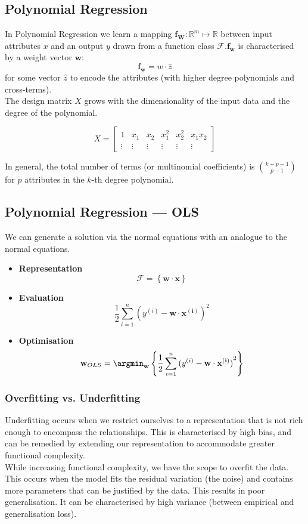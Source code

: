 \subsection{Polynomial Regression}
In Polynomial Regression we learn a mapping $\mathbf{f_W}:\mathbb{R}^{m}\mapsto
\mathbb{R}$ between input attributes $x$ and an output $y$ drawn from a function
class $\mathcal{F}$.$\mathbf{f_w}$ is characterised by a weight vector $\mathbf{w}$:
\[\mathbf{f_w}=w\cdot \hat{z}\]
for some vector $\hat{z}$ to encode the attributes (with higher degree
polynomials and cross-terms).\\
The design matrix $X$ grows with the dimensionality of the input data and the
degree of the polynomial.
\begin{example}
\[X=\begin{bmatrix} 1&x_1&x_2&x_1^2&x_2^{2}&x_1 x_2 \\
\vdots&\vdots&\vdots&\vdots&\vdots&\vdots\end{bmatrix} \] 
\end{example}
In general, the total number of terms (or multinomial coefficients) is
$\binom{k+p-1}{p-1}$ for $p$ attributes in the $k$-th degree polynomial.

\subsection{Polynomial Regression --- OLS}
We can generate a solution via the normal equations with an analogue to the
normal equations.
\begin{itemize}
  \item \textbf{Representation} \[\mathcal{F}=\left\{ \mathbf{w\cdot x} \right\}\]
  \item \textbf{Evaluation} \[\frac{1}{2}\sum_{i=1}^{n} {(y^{(i)}-\mathbf{w\cdot x^{(i)}})}^{2}\]
  \item \textbf{Optimisation} \[\mathbf{w}_{OLS}=\argmin_\mathbf{w}\left\{
      \frac{1}{2}\sum_{i=1}^{n} {(y^{(i)}-\mathbf{w\cdot x^{(i)}})}^{2} \right\}\]
\end{itemize}

\subsubsection{Overfitting vs. Underfitting}
Underfitting occurs when we restrict ourselves to a representation that is not
rich enough to encompass the relationships. This is characterised by high bias,
and can be remedied by extending our representation to accommodate greater
functional complexity.\\
While increasing functional complexity, we have the scope to overfit the data.
This occurs when the model fits the residual variation (the noise) and contains
more parameters that can be justified by the data. This results in poor
generalisation. It can be characterised by high variance (between empirical and
generalisation loss).
